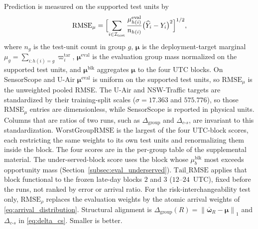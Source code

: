 \documentclass[letterpaper,journal]{IEEEtran}
\begin{document}
Prediction is measured on the supported test units by
\[
 \mathrm{RMSE}_{\mu}
 =
 \Bigl[\sum_{i\in\mathcal{I}_{\mathrm{test}}}
 \frac{\mu^{\mathrm{eval}}_{h(i)}}{n_{h(i)}}
 \bigl(\widehat Y_i-Y_i\bigr)^2\Bigr]^{1/2},
\]
where $n_g$ is the test-unit count in group $g$, $\boldsymbol\mu$ is the
deployment-target marginal $\mu_g=\sum_{i:h(i)=g}\varpi_i^{\mathrm{tar}}$,
$\boldsymbol\mu^{\mathrm{eval}}$ is the evaluation group mass normalized on
the supported test units, and $\boldsymbol\mu^{\mathrm{blk}}$ aggregates
$\boldsymbol\mu$ to the four UTC blocks.  On SensorScope and U-Air
$\boldsymbol\mu^{\mathrm{eval}}$ is uniform on the supported test units, so
$\mathrm{RMSE}_{\mu}$ is the unweighted pooled RMSE.
The U-Air and NSW-Traffic targets are standardized by their training-split
scales ($\sigma=17.363$ and $575.776$), so those $\mathrm{RMSE}_{\mu}$ entries
are dimensionless, while SensorScope is reported in physical units.  Columns
that are ratios of two runs, such as $\Delta_{\mathrm{group}}$ and
$\Delta_{c\text{-}s}$, are invariant to this standardization.
$\mathrm{WorstGroupRMSE}$ is the largest of the four UTC-block scores, each
restricting the same weights to its own test units and renormalizing them
inside the block.  The four scores are in the per-group table of the
supplemental material.  The under-served-block score uses the block whose
$\mu^{\mathrm{blk}}_b$ most exceeds opportunity mass
(Section~\ref{subsec:eval_underserved}).
$\mathrm{Tail\_RMSE}$ applies that block functional to the frozen late-day
blocks $2$ and $3$ ($12$--$24$~UTC), fixed before the runs, not ranked by
error or arrival ratio.
For the risk-interchangeability test only, $\mathrm{RMSE}_{\rho}$ replaces the
evaluation weights by the atomic arrival weights of
\eqref{eq:arrival_distribution}.  Structural
alignment is $\Delta_{\mathrm{group}}(R)=\left\|\overline{\boldsymbol\omega}_R-\boldsymbol\mu\right\|_1$
and $\Delta_{c\text{-}s}$ in \eqref{eq:delta_cs}.  Smaller is better.
\end{document}
